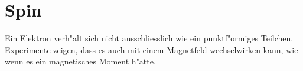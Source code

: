 \chapter{Spin}
\rhead{}
Ein Elektron verh"alt sich nicht ausschliesslich wie ein punktf"ormiges
Teilchen.
Experimente zeigen, dass es auch mit einem Magnetfeld wechselwirken
kann, wie wenn es ein magnetisches Moment h"atte.

